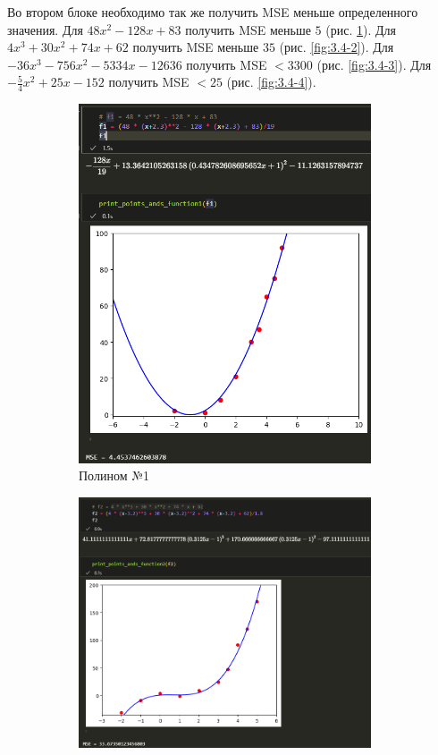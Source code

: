 \documentclass[14pt,a4paper]{extarticle}
\begin{document}
        Во втором блоке необходимо так же получить MSE меньше
определенного значения. Для $48x^2 - 128x + 83$ получить MSE
меньше $5$ (рис. \ref{fig:3.4-1}). Для $4x^3 + 30x^2 + 74x + 62$
получить MSE меньше $35$ (рис. \ref{fig:3.4-2}). Для $-36 x^3 - 
756 x^2 - 5334 x - 12636$ получить MSE $< 3300$ (рис. \ref{fig:3.4-3}).
Для $- \frac{5}{4} x^2 + 25x - 152$ получить MSE $<25$ (рис. \ref{fig:3.4-4}).
\begin{figure}[ht!]
    \begin{subfigure}{.5\textwidth}
        \centering
        \includegraphics[width=0.95\textwidth]{figures/3.4 1.png}
        \caption{Полином №1}
        \label{fig:3.4-1}
    \end{subfigure}%
    \begin{subfigure}{.5\textwidth}
        \centering
        \includegraphics[width=0.95\textwidth]{figures/3.4 2.png}

\end{subfigure}
\end{figure}
\end{document}
